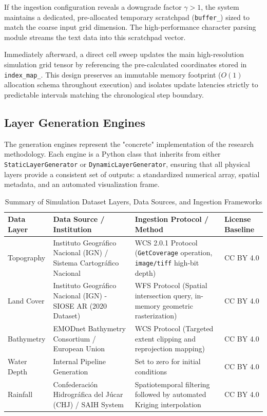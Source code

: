 If the ingestion configuration reveals a downgrade factor $\gamma > 1$, the system maintains a dedicated, pre-allocated temporary 
scratchpad (\texttt{buffer\_}) sized to match the coarse input grid dimension. The high-performance character parsing module streams the 
text data into this scratchpad vector. 

Immediately afterward, a direct cell sweep updates the main high-resolution simulation grid tensor by referencing the pre-calculated 
coordinates stored in \texttt{index\_map\_}. This design preserves an immutable memory footprint ($O(1)$ allocation schema throughout 
execution) and isolates update latencies strictly to predictable intervals matching the chronological step boundary.


\subsection{Layer Generation Engines}

The generation engines represent the "concrete" implementation of the research methodology. Each engine is a Python 
class that inherits from either \texttt{StaticLayerGenerator} or \texttt{DynamicLayerGenerator}, ensuring that all physical layers provide 
a consistent set of outputs: a standardized numerical array, spatial metadata, and an automated visualization frame.

\begin{table}[htbp]
    \centering
    \caption{Summary of Simulation Dataset Layers, Data Sources, and Ingestion Frameworks}
    \label{tab:data_sources_summary}
    \small
    \begin{tabularx}{\textwidth}{l X X l}
        \toprule
        \textbf{Data Layer} & \textbf{Data Source / Institution} & \textbf{Ingestion Protocol / Method} & \textbf{License Baseline} \\
        \midrule
        Topography & 
        Instituto Geográfico Nacional (IGN) / Sistema Cartográfico Nacional & 
        WCS 2.0.1 Protocol (\texttt{GetCoverage} operation, \texttt{image/tiff} high-bit depth) & 
        CC BY 4.0 \\
        \addlinespace
        Land Cover & 
        Instituto Geográfico Nacional (IGN) - SIOSE AR (2020 Dataset) & 
        WFS Protocol (Spatial intersection query, in-memory geometric rasterization) & 
        CC BY 4.0 \\
        \addlinespace
        Bathymetry & 
        EMODnet Bathymetry Consortium / European Union & 
        WCS Protocol (Targeted extent clipping and reprojection mapping) & 
        CC BY 4.0 \\
        \addlinespace
        Water Depth & 
        Internal Pipeline Generation & 
        Set to zero for initial conditions & 
        CC BY 4.0 \\
        \addlinespace
        Rainfall & 
        Confederación Hidrográfica del Júcar (CHJ) / SAIH System & 
        Spatiotemporal filtering followed by automated Kriging interpolation & 
        CC BY 4.0 \\
        \bottomrule
    \end{tabularx}
\end{table}


